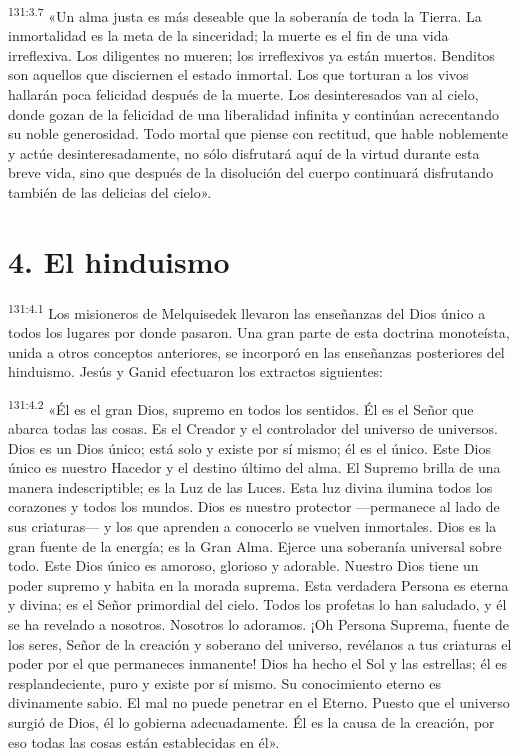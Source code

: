 \par 
\textsuperscript{131:3.7} «Un alma justa es más deseable que la soberanía de toda la Tierra. La inmortalidad es la meta de la sinceridad; la muerte es el fin de una vida irreflexiva. Los diligentes no mueren; los irreflexivos ya están muertos. Benditos son aquellos que disciernen el estado inmortal. Los que torturan a los vivos hallarán poca felicidad después de la muerte. Los desinteresados van al cielo, donde gozan de la felicidad de una liberalidad infinita y continúan acrecentando su noble generosidad. Todo mortal que piense con rectitud, que hable noblemente y actúe desinteresadamente, no sólo disfrutará aquí de la virtud durante esta breve vida, sino que después de la disolución del cuerpo continuará disfrutando también de las delicias del cielo».

\section*{4. El hinduismo}
\par 
\textsuperscript{131:4.1} Los misioneros de Melquisedek llevaron las enseñanzas del Dios único a todos los lugares por donde pasaron. Una gran parte de esta doctrina monoteísta, unida a otros conceptos anteriores, se incorporó en las enseñanzas posteriores del hinduismo. Jesús y Ganid efectuaron los extractos siguientes:

\par 
\textsuperscript{131:4.2} «Él es el gran Dios, supremo en todos los sentidos. Él es el Señor que abarca todas las cosas. Es el Creador y el controlador del universo de universos. Dios es un Dios único; está solo y existe por sí mismo; él es el único. Este Dios único es nuestro Hacedor y el destino último del alma. El Supremo brilla de una manera indescriptible; es la Luz de las Luces. Esta luz divina ilumina todos los corazones y todos los mundos. Dios es nuestro protector ---permanece al lado de sus criaturas--- y los que aprenden a conocerlo se vuelven inmortales. Dios es la gran fuente de la energía; es la Gran Alma. Ejerce una soberanía universal sobre todo. Este Dios único es amoroso, glorioso y adorable. Nuestro Dios tiene un poder supremo y habita en la morada suprema. Esta verdadera Persona es eterna y divina; es el Señor primordial del cielo. Todos los profetas lo han saludado, y él se ha revelado a nosotros. Nosotros lo adoramos. ¡Oh Persona Suprema, fuente de los seres, Señor de la creación y soberano del universo, revélanos a tus criaturas el poder por el que permaneces inmanente! Dios ha hecho el Sol y las estrellas; él es resplandeciente, puro y existe por sí mismo. Su conocimiento eterno es divinamente sabio. El mal no puede penetrar en el Eterno. Puesto que el universo surgió de Dios, él lo gobierna adecuadamente. Él es la causa de la creación, por eso todas las cosas están establecidas en él».

